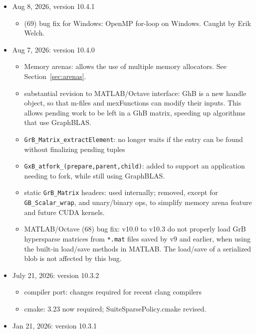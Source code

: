 \begin{itemize}
\item Aug 8, 2026, version 10.4.1

    \begin{itemize}
    \item (69) bug fix for Windows: OpenMP for-loop on Windows.
        Caught by Erik Welch.
    \end{itemize}

\item Aug 7, 2026: version 10.4.0

    \begin{itemize}
    \item Memory arenas: allows the use of multiple memory allocators.
        See Section~\ref{sec:arenas}.
    \item substantial revision to MATLAB/Octave interface: GhB is a new handle
        object, so that m-files and mexFunctions can modify their inputs.  This
        allows pending work to be left in a GhB matrix, speeding up algorithms
        that use GraphBLAS.
    \item \verb'GrB_Matrix_extractElement': no longer waits if the entry can be
        found without finalizing pending tuples
    \item \verb'GxB_atfork_(prepare,parent,child)': added to support an
        application needing to fork, while still using GraphBLAS.
    \item static \verb'GrB_Matrix' headers: used internally; removed, except for
        \verb'GB_Scalar_wrap', and unary/binary ops, to simplify memory arena
        feature and future CUDA kernels.
    \item MATLAB/Octave (68) bug fix:  v10.0 to v10.3 do not properly load GrB
        hypersparse matrices from \verb'*.mat' files saved by v9 and earlier,
        when using the built-in load/save methods in MATLAB.  The load/save of
        a serialized blob is not affected by this bug.
    \end{itemize}

\item July 21, 2026: version 10.3.2

    \begin{itemize}
    \item compiler port: changes required for recent clang compilers
    \item cmake: 3.23 now required; SuiteSparsePolicy.cmake revised.
    \end{itemize}

\item Jan 21, 2026: version 10.3.1


\end{itemize}

